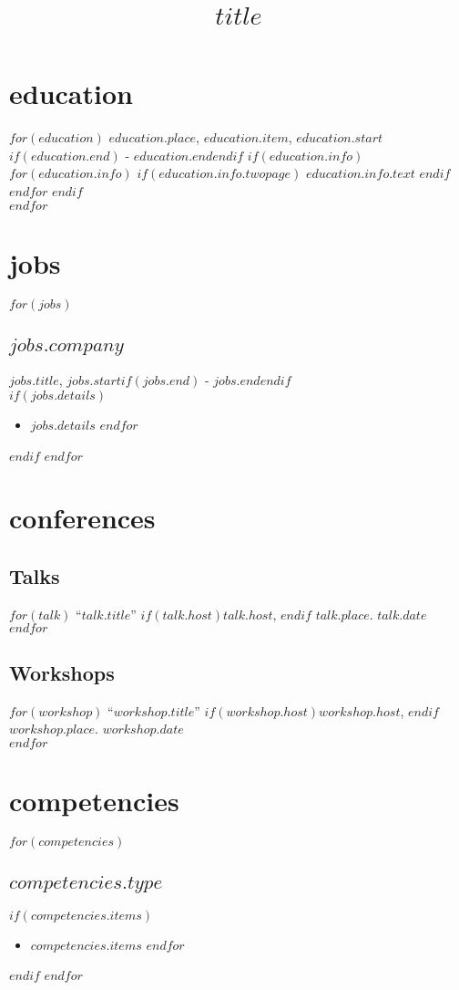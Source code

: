 \documentclass[11pt, A4]{article}
\title{$title$}
\begin{document}
\maketitle

\section{education}
$for(education)$
$education.place$, $education.item$, $education.start$$if(education.end)$ - $education.end$$endif$
$if(education.info)$ $for(education.info)$ $if(education.info.twopage)$ $education.info.text$ $endif$ $endfor$ $endif$ \\[.25cm]
$endfor$

\section{jobs}
$for(jobs)$
\subsection{$jobs.company$}
$jobs.title$,
$jobs.start$$if(jobs.end)$ - $jobs.end$$endif$\\[.25cm]
$if(jobs.details)$
\begin{itemize}
$for(jobs.details)$
\item $jobs.details$
$endfor$
\end{itemize}
$endif$
$endfor$

\section{conferences}

\subsection{Talks}
$for(talk)$
``$talk.title$''
$if(talk.host)$$talk.host$, $endif$
$talk.place$.
$talk.date$\\[.25cm]
$endfor$

\subsection{Workshops}
$for(workshop)$
``$workshop.title$''
$if(workshop.host)$$workshop.host$, $endif$
$workshop.place$.
$workshop.date$\\[.25cm]
$endfor$

\section{competencies}
$for(competencies)$
\subsection{$competencies.type$}
$if(competencies.items)$
\begin{itemize}
$for(competencies.items)$
\item $competencies.items$
$endfor$
\end{itemize}
$endif$
$endfor$
\end{document}
